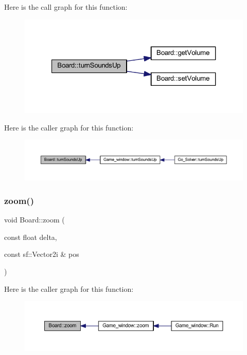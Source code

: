 Here is the call graph for this function\+:
\nopagebreak
\begin{figure}[H]
\begin{center}
\leavevmode
\includegraphics[width=321pt]{class_board_a77d145afa8d71a85c4097aca08c30525_cgraph}
\end{center}
\end{figure}
Here is the caller graph for this function\+:
\nopagebreak
\begin{figure}[H]
\begin{center}
\leavevmode
\includegraphics[width=350pt]{class_board_a77d145afa8d71a85c4097aca08c30525_icgraph}
\end{center}
\end{figure}
\mbox{\label{class_board_a0b098808fd9214c752097a623a7c717e}} 
\subsubsection{\texorpdfstring{zoom()}{zoom()}}
{\footnotesize\ttfamily void Board\+::zoom (\begin{DoxyParamCaption}\item[{const float}]{delta,  }\item[{const sf\+::\+Vector2i \&}]{pos }\end{DoxyParamCaption})}

Here is the caller graph for this function\+:
\nopagebreak
\begin{figure}[H]
\begin{center}
\leavevmode
\includegraphics[width=350pt]{class_board_a0b098808fd9214c752097a623a7c717e_icgraph}
\end{center}
\end{figure}


